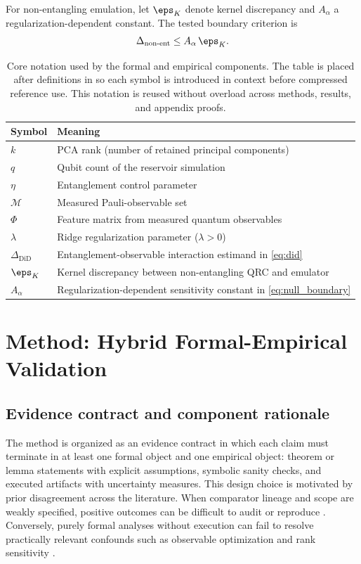 For non-entangling emulation, let $\eps_K$ denote kernel discrepancy and $A_\alpha$ a regularization-dependent constant. The tested boundary criterion is
\begin{equation}
\Delta_{\text{non-ent}}\le A_\alpha\,\eps_K.
\label{eq:null_boundary}
\end{equation}

\begin{table}[t]
\caption{Core notation used by the formal and empirical components. The table is placed after definitions in  so each symbol is introduced in context before compressed reference use. This notation is reused without overload across methods, results, and appendix proofs.}
\label{tab:notation}
\centering
\small
\renewcommand{\arraystretch}{1.1}
\setlength{\tabcolsep}{4pt}
\begin{tabular}{ll}
\toprule
Symbol & Meaning \\
\midrule
$k$ & PCA rank (number of retained principal components) \\
$q$ & Qubit count of the reservoir simulation \\
$\eta$ & Entanglement control parameter \\
$\mathcal{M}$ & Measured Pauli-observable set \\
$\Phi$ & Feature matrix from measured quantum observables \\
$\lambda$ & Ridge regularization parameter ($\lambda>0$) \\
$\Delta_{\mathrm{DiD}}$ & Entanglement-observable interaction estimand in \eqref{eq:did} \\
$\eps_K$ & Kernel discrepancy between non-entangling QRC and emulator \\
$A_\alpha$ & Regularization-dependent sensitivity constant in \eqref{eq:null_boundary} \\
\bottomrule
\end{tabular}
\end{table}

\section{Method: Hybrid Formal-Empirical Validation}\label{sec:method}
\subsection{Evidence contract and component rationale}
The method is organized as an evidence contract in which each claim must terminate in at least one formal object and one empirical object: theorem or lemma statements with explicit assumptions, symbolic sanity checks, and executed artifacts with uncertainty measures. This design choice is motivated by prior disagreement across the literature. When comparator lineage and scope are weakly specified, positive outcomes can be difficult to audit or reproduce \citep{S006,S020,S035}. Conversely, purely formal analyses without execution can fail to resolve practically relevant confounds such as observable optimization and rank sensitivity \citep{S001,S037,S038}.

